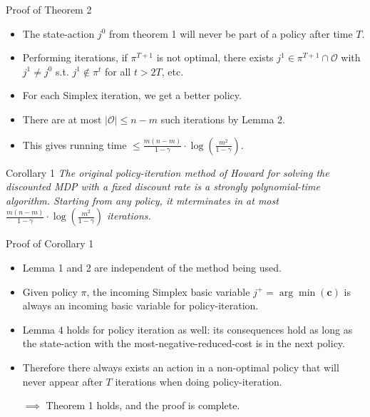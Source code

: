 \documentclass{beamer}
\renewcommand{\vec}[1]{\mathbf{#1}}
\begin{document}
\begin{frame}{Proof of Theorem 2}

\begin{itemize}
\item The state-action $j^0$ from theorem 1 will never be part of a policy after time $T$. 
\item Performing iterations, if $\pi^{T+1}$ is not optimal, there exists $j^1\in\pi^{T+1}\cap\mathcal{O}$ with $j^1\neq j^0$ s.t. $j^1\notin\pi^t$ for all $t>2T$, etc.
\item For each Simplex iteration, we get a better policy.
\item There are at most $|\mathcal{O}|\leq n-m$ such iterations by Lemma 2. 
\item This gives running time $\leq\frac{m(n-m)}{1-\gamma}\cdot\log\left(\!\frac{m^2}{1-\gamma} \right)$.

\end{itemize}

\end{frame}


\begin{frame}{Corollary 1}
\emph{
The original policy-iteration method of Howard for solving the discounted MDP with a fixed discount rate is a strongly polynomial-time algorithm. Starting from any policy, it mterminates in at most $\frac{m(n-m)}{1-\gamma}\cdot\log\left(\!\frac{m^2}{1-\gamma} \right)$ iterations.
}
\end{frame}


\begin{frame}{Proof of Corollary 1}

\begin{itemize}[<+->]
\item Lemma 1 and 2 are independent of the method being used.
\item Given policy $\pi$, the incoming Simplex basic variable $j^+=\arg\min(\vec{c})$ is always an incoming basic variable for policy-iteration.
\item Lemma 4 holds for policy iteration as well: its consequences hold as long as the state-action with the most-negative-reduced-cost is in the next policy.
\item Therefore there always exists an action in a non-optimal policy that will never appear after $T$ iterations when doing policy-iteration.
\begin{center}
$\implies$ Theorem 1 holds, and the proof is complete.
\end{center}

\end{itemize}
\end{frame}

\end{document}
